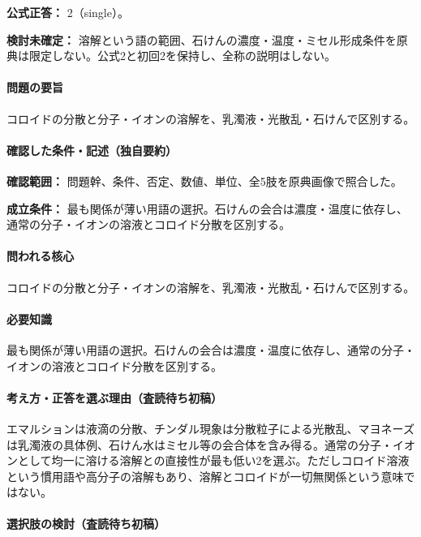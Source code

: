 \textbf{公式正答：} 2（single）。

\par\textbf{検討未確定：} 溶解という語の範囲、石けんの濃度・温度・ミセル形成条件を原典は限定しない。公式2と初回2を保持し、全称の説明はしない。

\paragraph{問題の要旨} コロイドの分散と分子・イオンの溶解を、乳濁液・光散乱・石けんで区別する。

\paragraph{確認した条件・記述（独自要約）}\mbox{}\par

\noindent\textbf{確認範囲：} 問題幹、条件、否定、数値、単位、全5肢を原典画像で照合した。\par

\noindent\textbf{成立条件：} 最も関係が薄い用語の選択。石けんの会合は濃度・温度に依存し、通常の分子・イオンの溶液とコロイド分散を区別する。\par

\paragraph{問われる核心} コロイドの分散と分子・イオンの溶解を、乳濁液・光散乱・石けんで区別する。

\paragraph{必要知識} 最も関係が薄い用語の選択。石けんの会合は濃度・温度に依存し、通常の分子・イオンの溶液とコロイド分散を区別する。

\paragraph{考え方・正答を選ぶ理由（査読待ち初稿）} エマルションは液滴の分散、チンダル現象は分散粒子による光散乱、マヨネーズは乳濁液の具体例、石けん水はミセル等の会合体を含み得る。通常の分子・イオンとして均一に溶ける溶解との直接性が最も低い2を選ぶ。ただしコロイド溶液という慣用語や高分子の溶解もあり、溶解とコロイドが一切無関係という意味ではない。

\paragraph{選択肢の検討（査読待ち初稿）}\mbox{}\par

